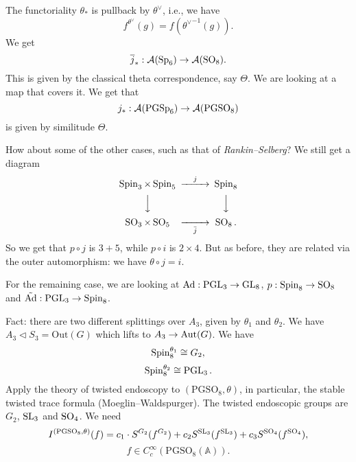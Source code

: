 \documentclass[reqno]{amsart} 
\begin{document}
The functoriality $\theta _\ast $ is pullback by $\theta^\vee $, i.e., we have
\begin{equation*}
  f^{\theta^\vee } (g) = f ( {\theta^\vee }^{-1}(g) ).
\end{equation*}
We get
\begin{equation*}
  \overline{j} _\ast : \mathcal{A} (\operatorname{Sp}_6 ) \rightarrow \mathcal{A} (\operatorname{SO}_8).
\end{equation*}
This is given by the classical theta correspondence, say $\Theta$.  We are looking at a map that covers it.  We get that
\begin{equation*}
  j _\ast : \mathcal{A} (\operatorname{PGSp}_6 ) \rightarrow \mathcal{A} (\mathrm{PGSO}_8 )
\end{equation*}
is given by similitude $\Theta$.

How about some of the other cases, such as that of \emph{Rankin--Selberg}?  We still get a diagram
\begin{equation*}
  \begin{CD}         
    \Spin_3  \times \Spin_5 @>j>> \Spin_8 \\
    @VVV  @VVV \\
    \SO_3 \times \SO_5  @>>\bar{j}> \SO_8. \\
  \end{CD}
\end{equation*}
So we get that $p \circ j$ is $3 + 5$, while $p \circ i$ is $2 \times 4$.  But as before, they are related via the outer automorphism: we have $\theta \circ j = i$.

For the remaining case, we are looking at $\operatorname{Ad} : \operatorname{PGL}_3 \rightarrow \operatorname{GL}_8$, $p : \operatorname{Spin}_8 \rightarrow \operatorname{SO}_8$ and $\tilde{\operatorname{Ad}} : \operatorname{PGL}_3 \rightarrow \operatorname{Spin}_8$.

Fact: there are two different splittings over $A_3$, given by $\theta_1$ and $\theta_2$.  We have $A_3 \triangleleft S_3 = \mathrm{Out}(G) $ which lifts to $A_3 \rightarrow \operatorname{Aut}(G)$.  We have
\begin{equation*}
  \operatorname{Spin}_8^{\theta_1 } \cong G_2,
\end{equation*}
\begin{equation*}
  \operatorname{Spin}_8^{\theta_2 } \cong \operatorname{PGL}_3.
\end{equation*}
Apply the theory of twisted endoscopy to $(\mathrm{PGSO}_8, \theta )$, in particular, the stable twisted trace formula (Moeglin--Waldspurger).  The twisted endoscopic groups are $G_2$, $\operatorname{SL}_3$ and $\operatorname{SO}_4$.  We need
\begin{equation*}
  I^{(\mathrm{PGSO}_8, \theta )}(f) = c_1 \cdot S^{G_2 } (f^{G_2 })
  + c_2 S^{\operatorname{SL}_3 } (f^{\operatorname{SL}_3 })
  + c_3 S^{\operatorname{SO}_4 } (f^{\operatorname{SO}_4 }),
\end{equation*}
\begin{equation*}
  f  \in C_c^\infty (\mathrm{PGSO}_8 (\mathbb{A} )).
\end{equation*}
\end{document}
